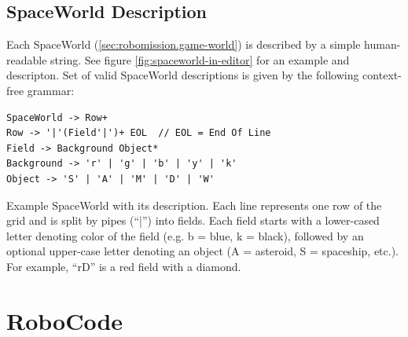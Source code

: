 \subsection{SpaceWorld Description}
\label{sec:impl.spaceworld}

Each SpaceWorld (\cref{sec:robomission.game-world}) is described by a simple
human-readable string.
See figure \ref{fig:spaceworld-in-editor} for an example and descripton.
Set of valid SpaceWorld descriptions is given by the
following context-free grammar:

\begin{lstlisting}
SpaceWorld -> Row+
Row -> '|'(Field'|')+ EOL  // EOL = End Of Line
Field -> Background Object*
Background -> 'r' | 'g' | 'b' | 'y' | 'k'
Object -> 'S' | 'A' | 'M' | 'D' | 'W'
\end{lstlisting}




%
{Example SpaceWorld with its description. %
Each line represents one row of the grid
and is split by pipes (``|'') into fields.
Each field starts with a lower-cased letter denoting color of the field
(e.g. b = blue, k = black),
followed by an optional upper-case letter denoting an object
(A = asteroid, S = spaceship, etc.).
For example, ``rD'' is a red field with a diamond.}



\section{RoboCode}
\label{sec:robocode}

